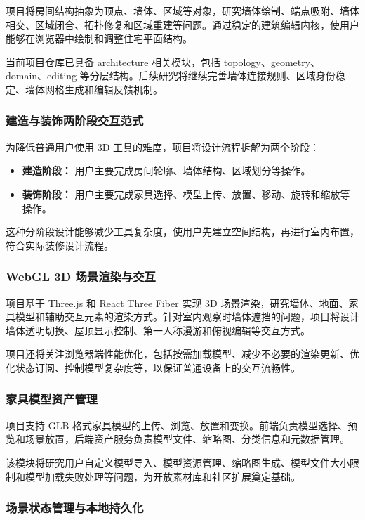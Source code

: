 \documentclass[UTF8,fontset=fandol,zihao=-4]{ctexart}
\begin{document}
项目将房间结构抽象为顶点、墙体、区域等对象，研究墙体绘制、端点吸附、墙体相交、区域闭合、拓扑修复和区域重建等问题。通过稳定的建筑编辑内核，使用户能够在浏览器中绘制和调整住宅平面结构。

当前项目仓库已具备 architecture 相关模块，包括 topology、geometry、domain、editing 等分层结构。后续研究将继续完善墙体连接规则、区域身份稳定、墙体网格生成和编辑反馈机制。

\subsubsection{建造与装饰两阶段交互范式}

为降低普通用户使用 3D 工具的难度，项目将设计流程拆解为两个阶段：

\begin{itemize}
  \item \textbf{建造阶段：} 用户主要完成房间轮廓、墙体结构、区域划分等操作。
  \item \textbf{装饰阶段：} 用户主要完成家具选择、模型上传、放置、移动、旋转和缩放等操作。
\end{itemize}

这种分阶段设计能够减少工具复杂度，使用户先建立空间结构，再进行室内布置，符合实际装修设计流程。

\subsubsection{WebGL 3D 场景渲染与交互}

项目基于 Three.js 和 React Three Fiber 实现 3D 场景渲染，研究墙体、地面、家具模型和辅助交互元素的渲染方式。针对室内观察时墙体遮挡的问题，项目将设计墙体透明切换、屋顶显示控制、第一人称漫游和俯视编辑等交互方式。

项目还将关注浏览器端性能优化，包括按需加载模型、减少不必要的渲染更新、优化状态订阅、控制模型复杂度等，以保证普通设备上的交互流畅性。

\subsubsection{家具模型资产管理}

项目支持 GLB 格式家具模型的上传、浏览、放置和变换。前端负责模型选择、预览和场景放置，后端资产服务负责模型文件、缩略图、分类信息和元数据管理。

该模块将研究用户自定义模型导入、模型资源管理、缩略图生成、模型文件大小限制和模型加载失败处理等问题，为开放素材库和社区扩展奠定基础。

\subsubsection{场景状态管理与本地持久化}
\end{document}
